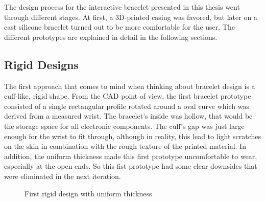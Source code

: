 The design process for the interactive bracelet presented in this thesis went through different stages. At first, a 3D-printed casing was favored, but later on a cast silicone bracelet turned out to be more comfortable for the user. The different prototypes are explained in detail in the following sections.

\subsection{Rigid Designs}

The first approach that comes to mind when thinking about bracelet design is a cuff-like, rigid shape. From the CAD point of view, the first bracelet prototype consisted of a single rectangular profile rotated around a oval curve which was derived from a measured wrist. The bracelet's inside was hollow, that would be the storage space for all electronic components. The cuff's gap was just large enough for the wrist to fit through, although in reality, this lead to light scratches on the skin in combination with the rough texture of the printed material. In addition, the uniform thickness made this first prototype uncomfortable to wear, especially at the open ends. So this fist prototype had some clear downsides that were eliminated in the next iteration.

\begin{figure}[bth]
	\myfloatalign
	 \quad
	\caption{First rigid design with uniform thickness}
\end{figure}

